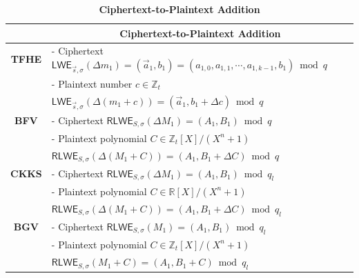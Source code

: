\begin{table}[h]
\begin{tabular}{|c||l|}
\hline
&\multicolumn{1}{c|}{\textbf{Ciphertext-to-Plaintext Addition}}\\\hline\hline
\textbf{TFHE}&- Ciphertext $\textsf{LWE}_{\vec{s}, \sigma}(\Delta m_1) = (\vec{a}_1, b_1) = (a_{1,0}, a_{1, 1}, \cdots, a_{1, k-1}, b_1) \bmod q$\\
&- Plaintext number $c \in \mathbb{Z}_t$\\
&$\textsf{LWE}_{\vec{s}, \sigma}(\Delta (m_1 + c)) = (\vec{a}_1, b_1+\Delta c) \bmod q$\\\hline
\textbf{BFV}&- Ciphertext $\textsf{RLWE}_{S, \sigma}(\Delta M_1) = (A_1, B_1) \bmod q$\\
&- Plaintext polynomial $C \in \mathbb{Z}_t[X]/(X^n + 1)$\\
&$\textsf{RLWE}_{S, \sigma}(\Delta (M_1 + C)) =(A_1,B_1+\Delta C) \bmod q$\\\hline
\textbf{CKKS}&- Ciphertext $\textsf{RLWE}_{S, \sigma}(\Delta M_1) = (A_1, B_1)  \bmod q_l$\\
&- Plaintext polynomial $C \in \mathbb{R}[X]/(X^n + 1)$\\
&$\textsf{RLWE}_{S, \sigma}(\Delta (M_1 + C)) =(A_1,B_1+\Delta C) \bmod q_l$\\\hline
\textbf{BGV}&- Ciphertext $\textsf{RLWE}_{S, \sigma}(M_1) = (A_1, B_1) \bmod q_l$\\
&- Plaintext polynomial $C \in \mathbb{Z}_t[X]/(X^n + 1)$\\
&$\textsf{RLWE}_{S, \sigma}(M_1 + C) =(A_1,B_1+C) \bmod q_l$\\\hline
\end{tabular}
\caption{\textbf{Ciphertext-to-Plaintext Addition}}
\end{table}

